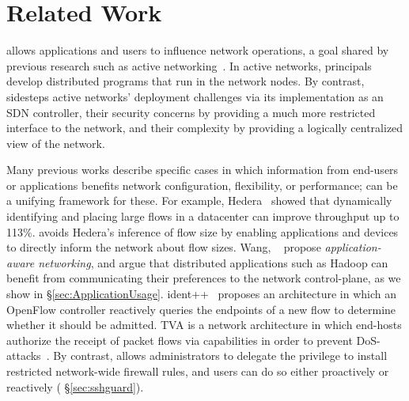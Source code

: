 

\chapter{Related Work}
\label{sec:related-work}




%
\sys allows applications and users to influence
network operations, a goal shared by previous research such as
active networking~\cite{ActiveNetworking}. In active networks, principals
develop distributed programs that run in the network nodes. By contrast,
\sys sidesteps active networks' deployment challenges via its implementation
as an SDN controller, their security concerns by providing a much more restricted
interface to the network, and their complexity by providing a logically centralized
view of the network.

%
Many previous works describe specific cases in which information
from end-users or applications benefits network configuration,
flexibility, or performance; \sys can be a unifying framework for
these.  For example, Hedera~\cite{alfares10hedera} showed that
dynamically identifying and placing large flows in a datacenter can
improve throughput up to 113\%. \sys avoids Hedera's
inference of flow size by enabling applications and devices to
directly inform the network about flow sizes. 
Wang, \etal~\cite{Wang:2012} propose \emph{application-aware networking},
and argue
that distributed applications such as Hadoop can benefit from
communicating their preferences to the network control-plane, as we
show in \S\ref{sec:ApplicationUsage}.
%
ident++~\cite{naous09ident++}
proposes an architecture in which an OpenFlow controller reactively
queries the endpoints of a new flow to determine whether it should
be admitted. 
TVA is a network architecture in which end-hosts authorize the receipt
of packet flows via capabilities in order to prevent DoS-attacks~\cite{Yang:2005}.
By contrast, \sys allows administrators to delegate the
privilege to install restricted network-wide firewall rules, and
users can do so either proactively or reactively (\cf
\S\ref{sec:sshguard}).  

